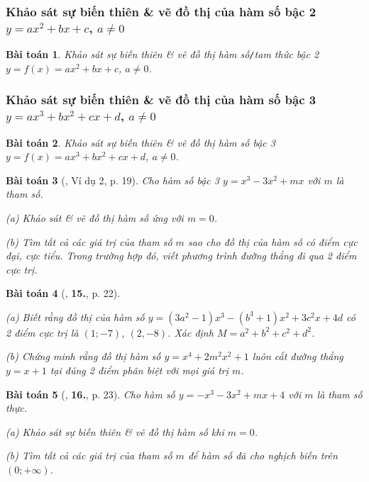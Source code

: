 \documentclass[12pt]{article}
\numberwithin{equation}{section}
\newtheorem{baitoan}{Bài toán}[section]
\begin{document}
\subsubsection{Khảo sát sự biến thiên \& vẽ đồ thị của hàm số bậc 2 $y = ax^2 + bx + c$, $a\ne 0$}

\begin{baitoan}
	Khảo sát sự biến thiên \& vẽ đồ thị hàm số\emph{\texttt{/}}tam thức bậc 2 $y = f(x) = ax^2 + bx + c$, $a\ne 0$.
\end{baitoan}

\subsubsection{Khảo sát sự biến thiên \& vẽ đồ thị của hàm số bậc 3 $y = ax^3 + bx^2 + cx + d$, $a\ne 0$}

\begin{baitoan}
	Khảo sát sự biến thiên \& vẽ đồ thị hàm số bậc 3 $y = f(x) = ax^3 + bx^2 + cx + d$, $a\ne 0$.
\end{baitoan}

\begin{baitoan}[\cite{TL_chuyen_Toan_Giai_Tich_12}, Ví dụ 2, p. 19]
	Cho hàm số bậc 3 $y = x^3 - 3x^2 + mx$ với $m$ là tham số.
	\begin{enumerate*}
		\item[(a)] Khảo sát \& vẽ đồ thị hàm số ứng với $m = 0$.
		\item[(b)] Tìm tất cả các giá trị của tham số $m$ sao cho đồ thị của hàm số có điểm cực đại, cực tiểu. Trong trường hợp đó, viết phương trình đường thẳng đi qua 2 điểm cực trị.
	\end{enumerate*}
\end{baitoan}

\begin{baitoan}[\cite{TL_chuyen_Toan_Giai_Tich_12}, \textbf{15.}, p. 22]
	\begin{enumerate*}
		\item[(a)] Biết rằng đồ thị của hàm số $y = (3a^2 - 1)x^3 - (b^3 + 1)x^2 + 3c^2x + 4d$ có 2 điểm cực trị là $(1;-7)$, $(2,-8)$. Xác định $M = a^2 + b^2 + c^2 + d^2$.
		\item[(b)] Chứng minh rằng đồ thị hàm số $y = x^4 + 2m^2x^2 + 1$ luôn cắt đường thẳng $y = x + 1$ tại đúng 2 điểm phân biệt với mọi giá trị $m$.
	\end{enumerate*}
\end{baitoan}

\begin{baitoan}[\cite{TL_chuyen_Toan_Giai_Tich_12}, \textbf{16.}, p. 23]
	Cho hàm số $y = -x^3 - 3x^2 + mx + 4$ với $m$ là tham số thực.
	\begin{enumerate*}
		\item[(a)] Khảo sát sự biến thiên \& vẽ đồ thị hàm số khi $m = 0$.
		\item[(b)] Tìm tất cả các giá trị của tham số $m$ để hàm số đã cho nghịch biến trên $(0;+\infty)$.
	\end{enumerate*}
\end{baitoan}
\end{document}
